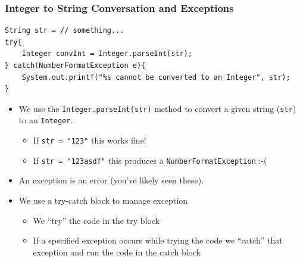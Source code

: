 \documentclass{beamer}
\begin{document}
\begin{frame}[fragile]
\frametitle{Integer to String Conversation and Exceptions}
    \begin{lstlisting}[basicstyle=\scriptsize, frame=trBL]
String str = // something...
try{
    Integer convInt = Integer.parseInt(str);
} catch(NumberFormatException e){
    System.out.printf("%s cannot be converted to an Integer", str);
}
    \end{lstlisting}
    \begin{itemize}
        \item We use the \lstinline|Integer.parseInt(str)| method to convert a given string (\lstinline|str|) to an \lstinline|Integer|.
        \begin{itemize}
            \item If \lstinline|str = "123"| this works fine!
            \item If \lstinline|str = "123asdf"| this produces a \lstinline|NumberFormatException| :-(
        \end{itemize}
        \pause
        \item An exception is an error (you've likely seen these). 
            \pause
        \item We use a try-catch block to manage exception
        \begin{itemize}
            \item We ``try'' the code in the try block
            \item If a specified exception occurs while trying the code we ``catch'' that exception and run the code in the catch block
        \end{itemize}
    \end{itemize}
\end{frame}

\end{document}
